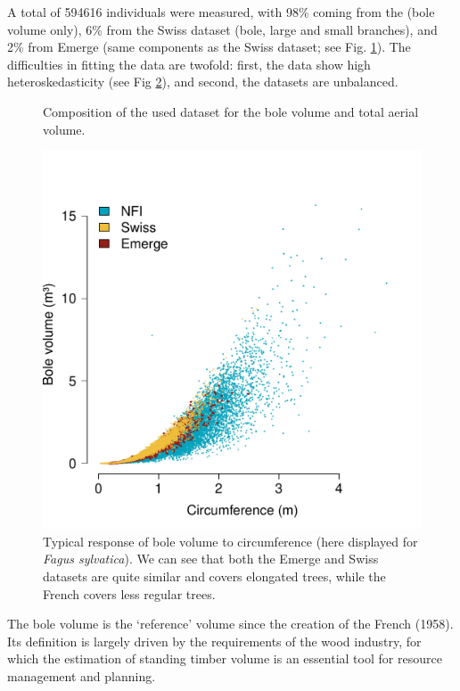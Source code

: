 A total of \num{594616} individuals were measured, with 98\% coming from the \NFI{} (bole volume only), 6\% from the Swiss dataset (bole, large and small branches), and 2\% from Emerge (same components as the Swiss dataset; see Fig. \ref{fig::compo}). The difficulties in fitting the data are twofold: first, the data show high heteroskedasticity (see Fig \ref{fig::fagSyl}), and second, the datasets are unbalanced.

\begin{figure}
	\centering
	
	\caption{Composition of the used dataset for the bole volume and total aerial volume.\label{fig::compo}}
\end{figure}

\begin{figure}
	\centering
	\includegraphics[scale = 0.5]{Figures/resp_fagus.pdf}
	\caption{Typical response of bole volume to circumference (here displayed for \textit{Fagus sylvatica}). We can see that both the Emerge and Swiss datasets \parencite{Deleuze2013,Didion2024} are quite similar and covers elongated trees, while the French \NFI{} covers less regular trees. \label{fig::fagSyl}}
\end{figure}

\begin{tcolorbox}[breakable, title = Bole volume (volume bois-fort tige)]
	The bole volume is the `reference' volume since the creation of the French \NFI{} (1958). Its definition is largely driven by the requirements of the wood industry, for which the estimation of standing timber volume is an essential tool for resource management and planning.
\end{tcolorbox}